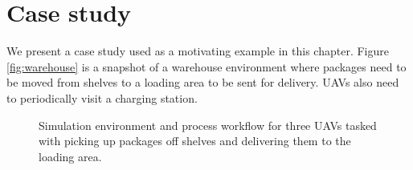 \section{Case study} \label{sec:casestudy}
We present a case study used as a motivating example in this chapter. Figure \ref{fig:warehouse} is a snapshot of a warehouse environment where packages need to be moved from shelves to a loading area to be sent for delivery. UAVs also need to periodically visit a charging station. 
\begin{figure}
\centering
{}
\hfill
{}
\caption{Simulation environment and process workflow for three UAVs tasked with picking up packages off shelves and delivering them to the loading area.}
\label{fig:casestudy}
\end{figure}

